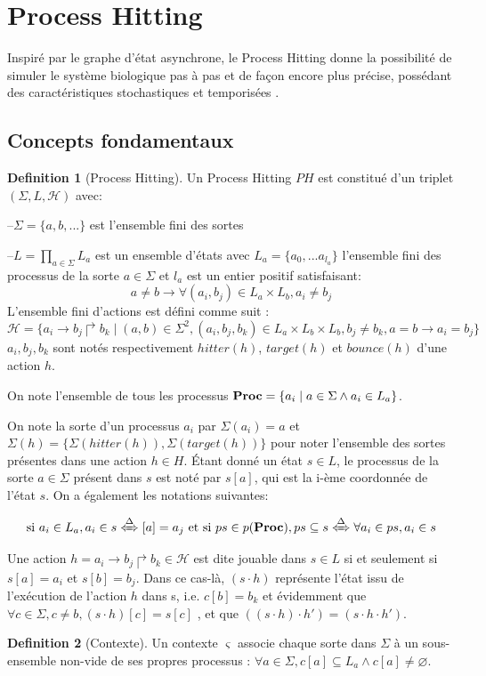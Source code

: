 \documentclass[11pt]{report}
\theoremstyle{definition}
\newtheorem{Def}{Definition}[chapter]
\newcommand{\acm}[3]{#1\to#2\Rsh#3}
\begin{document}
\section{Process Hitting}
Inspir\'e par le graphe d'\'etat asynchrone, le Process Hitting donne la possibilit\'e de simuler le syst\`eme biologique pas \`a pas et de fa\c con encore plus pr\'ecise, poss\'edant des caract\'eristiques stochastiques et temporis\'ees \citep{pauleve2011refining}.
\subsection{Concepts fondamentaux}
\begin{Def}[Process Hitting]
Un Process Hitting $PH$ est constitu\'e d'un triplet $(\Sigma, L, \mathscr{H})$ avec:

--$\Sigma=\{a,b,...\}$ est l'ensemble fini des sortes

--$L=\prod_{a\in\Sigma}{L_a}$ est un ensemble d'\'etats avec $L_a=\{a_0,...a_{l_a}\}$ l'ensemble fini des processus de la sorte $a\in\Sigma$ et $l_a$ est un entier positif satisfaisant:
$$a\neq b\to \forall(a_i,b_j)\in L_a\times L_b,a_i\neq b_j$$
L'ensemble fini d'actions est d\'efini comme suit :
$$\mathscr{H}=\{a_i\to b_j\Rsh b_k\mid(a,b)\in\Sigma^2,(a_i,b_j,b_k)\in L_a\times L_b\times L_b,b_j\neq b_k, a=b\to a_i=b_j\}$$
$a_i, b_j, b_k$ sont not\'es respectivement $hitter(h)$, $target(h)$ et $bounce(h)$ d'une action $h$.
\end{Def}
On note l'ensemble de tous les processus ${\bf Proc}=\{a_i\mid a\in\Sigma \land a_i\in L_a\}$.

On note la sorte d'un processus $a_i$ par $\Sigma(a_i)=a$ et 
$\Sigma(h)=\{\Sigma(hitter(h)),\Sigma(target(h))\}$
pour noter l'ensemble des sortes pr\'esentes dans une action $h\in H$. \'Etant donn\'e un \'etat $s\in L$, le processus de la sorte $a\in\Sigma$ pr\'esent dans $s$ est not\'e par $s[a]$, qui est la i-\`eme coordonn\'ee de l'\'etat $s$. On a \'egalement les notations suivantes:

$$	\text{si } a_i\in L_a, a_i\in s\xLeftrightarrow{\Delta}[a]=a_j \text{ et si } ps\in p({\bf Proc}), ps \subseteq s\xLeftrightarrow{\Delta}\forall a_i\in ps,a_i\in s$$

Une action $h= \acm{a_i}{b_j}{b_k} \in \mathscr{H}$ est dite jouable dans $s\in L$ si et seulement si $s[a]= a_i$ et $s[b]= b_j$. Dans ce cas-l\`a, $(s\cdot h)$ repr\'esente l'\'etat issu de l'ex\'ecution de l'action $h$ dans s, i.e. $c[b]= b_k$ et \'evidemment que $\forall c\in \Sigma,c\neq b,(s\cdot h)[c]=s[c]$ , et que $((s\cdot h)\cdot h')= (s\cdot h\cdot h')$.
\begin{Def}[Contexte]
Un contexte $\varsigma$ associe chaque sorte dans $\Sigma$ \`a un sous-ensemble non-vide de ses propres processus : $\forall a \in \Sigma, c[a]\subseteq L_a\land c[a]\neq \varnothing$.
\end{Def}
\end{document}
